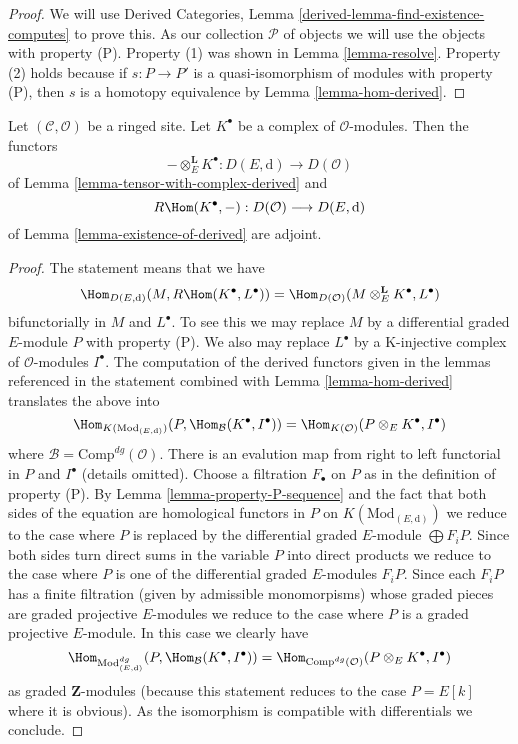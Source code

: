 \begin{proof}
We will use
Derived Categories, Lemma \ref{derived-lemma-find-existence-computes}
to prove this. As our collection $\mathcal{P}$
of objects we will use the objects with property (P).
Property (1) was shown in Lemma \ref{lemma-resolve}.
Property (2) holds because if $s : P \to P'$ is a quasi-isomorphism
of modules with property (P), then $s$ is a homotopy equivalence
by Lemma \ref{lemma-hom-derived}.
\end{proof}

\begin{lemma}
\label{lemma-tensor-with-complex-hom-adjoint}
Let $(\mathcal{C}, \mathcal{O})$ be a ringed site.
Let $K^\bullet$ be a complex of $\mathcal{O}$-modules.
Then the functors
$$
- \otimes_E^\mathbf{L} K^\bullet :
D(E, \text{d})
\longrightarrow
D(\mathcal{O})
$$
of Lemma \ref{lemma-tensor-with-complex-derived} and
$$
R\Hom(K^\bullet, -) : D(\mathcal{O}) \longrightarrow D(E, \text{d})
$$
of Lemma \ref{lemma-existence-of-derived} are adjoint.
\end{lemma}

\begin{proof}
The statement means that we have
$$
\Hom_{D(E, \text{d})}(M, R\Hom(K^\bullet, L^\bullet)) =
\Hom_{D(\mathcal{O})}(M \otimes^\mathbf{L}_E K^\bullet, L^\bullet)
$$
bifunctorially in $M$ and $L^\bullet$. To see this we may replace $M$
by a differential graded $E$-module $P$ with property (P).
We also may replace $L^\bullet$ by a K-injective complex of
$\mathcal{O}$-modules $I^\bullet$. The computation
of the derived functors given in the lemmas referenced in the statement
combined with Lemma \ref{lemma-hom-derived} translates the above into
$$
\Hom_{K(\text{Mod}_{(E, \text{d})})}
(P, \Hom_\mathcal{B}(K^\bullet, I^\bullet)) =
\Hom_{K(\mathcal{O})}(P \otimes_E K^\bullet, I^\bullet)
$$
where $\mathcal{B} = \text{Comp}^{dg}(\mathcal{O})$. 
There is an evalution map from right to left functorial
in $P$ and $I^\bullet$ (details omitted).
Choose a filtration $F_\bullet$ on $P$ as in the definition of property (P).
By Lemma \ref{lemma-property-P-sequence} and the fact that
both sides of the equation are homological functors in $P$
on $K(\text{Mod}_{(E, \text{d})})$
we reduce to the case where $P$ is replaced by
the differential graded $E$-module $\bigoplus F_iP$.
Since both sides turn direct sums in the variable $P$
into direct products we reduce to the case where $P$ is one of the
differential graded $E$-modules $F_iP$.
Since each $F_iP$ has a finite filtration (given by admissible
monomorpisms) whose graded pieces are graded projective $E$-modules
we reduce to the case where $P$ is a graded projective $E$-module.
In this case we clearly have
$$
\Hom_{\text{Mod}^{dg}_{(E, \text{d})}}
(P, \Hom_\mathcal{B}(K^\bullet, I^\bullet)) =
\Hom_{\text{Comp}^{dg}(\mathcal{O})}(P \otimes_E K^\bullet, I^\bullet)
$$
as graded $\mathbf{Z}$-modules (because this statement reduces to the case
$P = E[k]$ where it is obvious). As the isomorphism is compatible with
differentials we conclude.
\end{proof}

